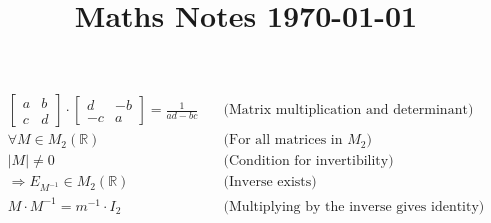 \documentclass{article}
\title{Maths Notes \today}
\begin{document}
\maketitle
\begin{align}
	\begin{bmatrix}
	a & b \\
	c & d
	\end{bmatrix} \cdot \begin{bmatrix}
	d & -b \\
	-c & a
	\end{bmatrix} = \frac{1}{ad - bc} \quad &\text{(Matrix multiplication and determinant)} \\ 
	\forall M \in M_2(\mathbb{R}) \quad &\text{(For all matrices in } M_2 \text{)} \\ 
	|M| \neq 0 \quad &\text{(Condition for invertibility)} \\ 
	\Rightarrow E_{M^{-1}} \in M_2(\mathbb{R}) \quad &\text{(Inverse exists)} \\ 
	M \cdot M^{-1} = m^{-1} \cdot I_2 \quad &\text{(Multiplying by the inverse gives identity)}
\end{align}
\end{document}
